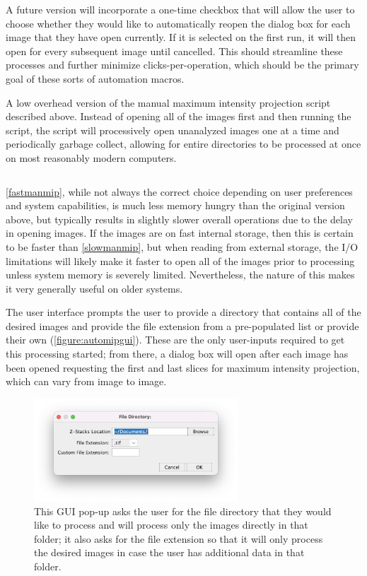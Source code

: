A future version will incorporate a one-time checkbox that will allow the user to choose whether they would like to automatically reopen the dialog box for each image that they have open currently. If it is selected on the first run, it will then open for every subsequent image until cancelled. This should streamline these processes and further minimize clicks-per-operation, which should be the primary goal of these sorts of automation macros.

\begin{code}
\caption{A low overhead version of the manual maximum intensity projection script described above. Instead of opening all of the images first and then running the script, the script will processively open unanalyzed images one at a time and periodically garbage collect, allowing for entire directories to be processed at once on most reasonably modern computers.}
\label{fastmanmip}

\inputminted[breaklines,frame=single,fontsize=\small]{python}{source/fast_manMIPper.py}

\end{code}

\autoref{fastmanmip}, while not always the correct choice depending on user preferences and system capabilities, is much less memory hungry than the original version above, but typically results in slightly slower overall operations due to the delay in opening images. If the images are on fast internal storage, then this is certain to be faster than \autoref{slowmanmip}, but when reading from external storage, the I/O limitations will likely make it faster to open all of the images prior to processing unless system memory is severely limited. Nevertheless, the nature of this makes it very generally useful on older systems.

The user interface prompts the user to provide a directory that contains all of the desired images and provide the file extension from a pre-populated list or provide their own (\autoref{figure:automipgui}). These are the only user-inputs required to get this processing started; from there, a dialog box will open after each image has been opened requesting the first and last slices for maximum intensity projection, which can vary from image to image.

\begin{figure}
\centering
\includegraphics[width=3in]{images/automipgui.png}
\caption{This GUI pop\hyp{}up asks the user for the file directory that they would like to process and will process only the images directly in that folder; it also asks for the file extension so that it will only process the desired images in case the user has additional data in that folder.}
\label{figure:automipgui}
\end{figure}

